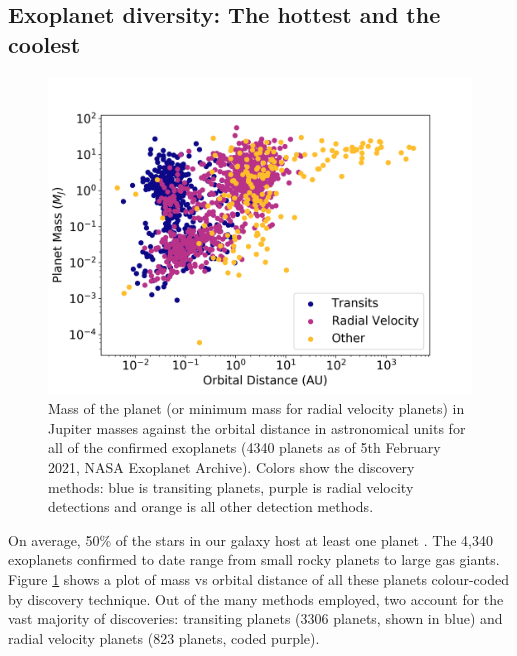 \subsection{Exoplanet diversity: The hottest and the coolest} %

\begin{figure}
    \centering
    \includegraphics[width = \linewidth]{MA_NASAexo.png}
    \caption{Mass of the planet (or minimum mass for radial velocity planets) in Jupiter masses against the orbital distance in astronomical units for all of the confirmed exoplanets (4340 planets as of 5th February 2021, NASA Exoplanet Archive). Colors show the discovery methods: blue is transiting planets, purple is radial velocity detections and orange is all other detection methods. }
    \label{int:fig:MA}
\end{figure}


On average, 50\% of the stars in our galaxy host at least one planet \citep{Howard2012,Dressing2013,Batalha2013,Silburt2015}. The 4,340 exoplanets confirmed to date range from small rocky planets to large gas giants. Figure  \ref{int:fig:MA} shows a plot of mass vs orbital distance of all these planets colour-coded by discovery technique. Out of the many methods employed, two account for the vast majority of discoveries: transiting planets (3306 planets, shown in blue) and radial velocity planets (823 planets, coded purple).

